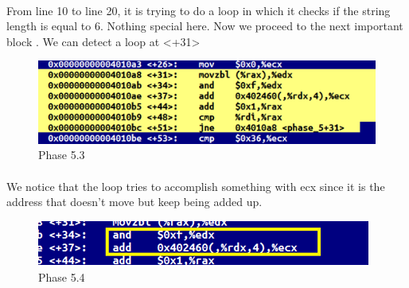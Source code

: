 \documentclass[a4paper]{article}
\begin{document}
\paragraph{}
From line 10 to line 20, it is trying to do a loop in which it checks if the string length is equal to 6. Nothing special here.\newline
Now we proceed to the next important block . We can detect a loop at \textless +31\textgreater 

\begin{figure}[h!]
  \includegraphics[width=\linewidth]{bai5_3.png}
  \caption{Phase 5.3}
  \label{}
\end{figure}


\paragraph{}
We notice that the loop tries to accomplish something with ecx since it is the address that doesn't move but keep being added up. 

\begin{figure}[h!]
  \includegraphics[width=\linewidth]{bai5_4.png}
  \caption{Phase 5.4}
  \label{}
\end{figure}
\end{document}
